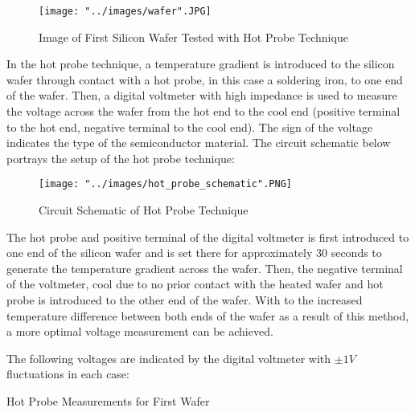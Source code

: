 \documentclass{article}
\begin{document}
	\begin{figure}[h!]
		\centering
		\texttt{[image: "../images/wafer".JPG]}
		\caption{Image of First Silicon Wafer Tested with Hot Probe Technique}
		\label{fig:wafer}
	\end{figure}
	
	In the hot probe technique, a temperature gradient is introduced to the silicon wafer through contact with a hot probe, in this case a soldering iron, to one end of the wafer. Then, a digital voltmeter with high impedance is used to measure the voltage across the wafer from the hot end to the cool end (positive terminal to the hot end, negative terminal to the cool end). The sign of the voltage indicates the type of the semiconductor material. The circuit schematic below portrays the setup of the hot probe technique:
	
	\begin{figure}[h!]
		\centering
		\texttt{[image: "../images/hot\_probe\_schematic".PNG]}
		\caption{Circuit Schematic of Hot Probe Technique}
		\label{fig:hot_probe_schematic}
	\end{figure}
	
	The hot probe and positive terminal of the digital voltmeter is first introduced to one end of the silicon wafer and is set there for approximately 30 seconds to generate the temperature gradient across the wafer. Then, the negative terminal of the voltmeter, cool due to no prior contact with the heated wafer and hot probe is introduced to the other end of the wafer. With to the increased temperature difference between both ends of the wafer as a result of this method, a more optimal voltage measurement can be achieved.
	
	The following voltages are indicated by the digital voltmeter with $\pm 1 V$ fluctuations in each case:
	
	\begin{table}[h!]
		\centering
		\caption{Hot Probe Measurements for First Wafer}
		\label{tab:hot_probe_measurements_p_type}
	\end{table}
	
\end{document}
